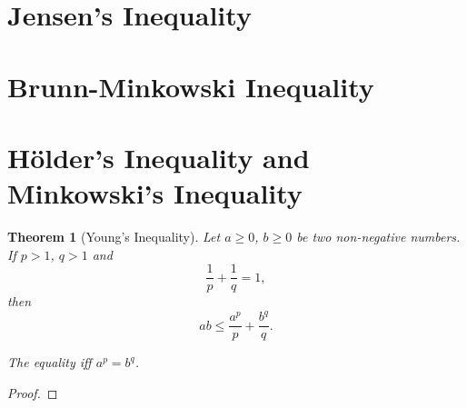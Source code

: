 \documentclass[openany]{book}
\theoremstyle{plain}
\newtheorem{theorem}{Theorem}[section] %
\theoremstyle{definition}
\begin{document}
\section{Jensen's Inequality}
\section{Brunn-Minkowski Inequality}
\section{H\"older's Inequality and Minkowski's Inequality}
\begin{theorem}[Young's Inequality]
	Let $a \geq 0$, $b \geq 0$ be two non-negative numbers. 
	If $p > 1$, $q > 1$ and
	\begin{equation*}
		\frac 1 p + \frac 1 q = 1,
	\end{equation*}
	then
	\begin{equation*}
		ab \leq \frac{a^p}{p} + \frac{b^q}{q}.
	\end{equation*}

	The equality iff $a^p = b^q$.
\end{theorem}
\begin{proof}
	
\end{proof}


\backmatter{}

\nocite{*} %
\printbibliography[heading=bibliography, title={Bibliography}]

\printindex[symbol]

\printindex
\end{document}
